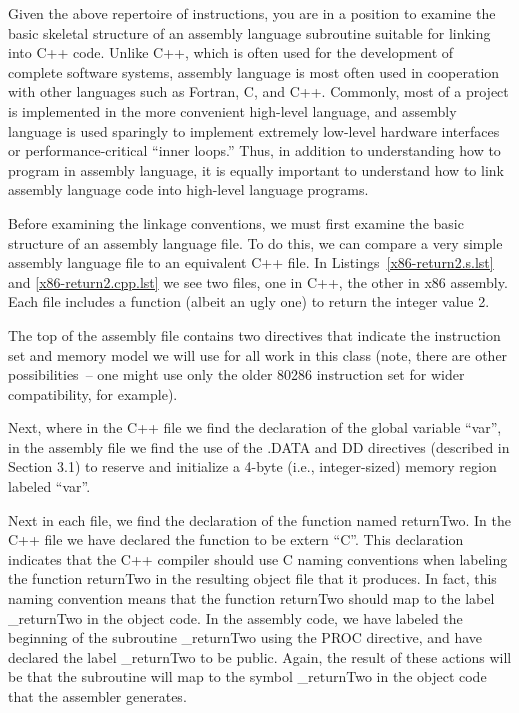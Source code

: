 Given the above repertoire of instructions, you are in a position to
examine the basic skeletal structure of an assembly language
subroutine suitable for linking into C++ code. Unlike C++, which is
often used for the development of complete software systems, assembly
language is most often used in cooperation with other languages such
as Fortran, C, and C++. Commonly, most of a project is implemented in
the more convenient high-level language, and assembly language is used
sparingly to implement extremely low-level hardware interfaces or
performance-critical ``inner loops.'' Thus, in addition to
understanding how to program in assembly language, it is equally
important to understand how to link assembly language code into
high-level language programs.

Before examining the linkage conventions, we must first examine the
basic structure of an assembly language file. To do this, we can
compare a very simple assembly language file to an equivalent C++
file. In Listings~\ref{x86-return2.s.lst} and \ref{x86-return2.cpp.lst} we see
two files, one in C++, the other in x86 assembly. Each file includes a
function (albeit an ugly one) to return the integer value 2.

The top of the assembly file contains two directives that indicate the
instruction set and memory model we will use for all work in this
class (note, there are other possibilities~-- one might use only the
older 80286 instruction set for wider compatibility, for example).

Next, where in the C++ file we find the declaration of the global
variable ``var'', in the assembly file we find the use of the .DATA
and DD directives (described in Section 3.1) to reserve and initialize
a 4-byte (i.e., integer-sized) memory region labeled ``var''.

\begin{figure}

\vspace{-0.25in}\end{figure}

Next in each file, we find the declaration of the function named
returnTwo. In the C++ file we have declared the function to be extern
``C''. This declaration indicates that the C++ compiler should use C
naming conventions when labeling the function returnTwo in the
resulting object file that it produces. In fact, this naming
convention means that the function returnTwo should map to the label
\_returnTwo in the object code. In the assembly code, we have labeled
the beginning of the subroutine \_returnTwo using the PROC directive,
and have declared the label \_returnTwo to be public. Again, the
result of these actions will be that the subroutine will map to the
symbol \_returnTwo in the object code that the assembler generates.

